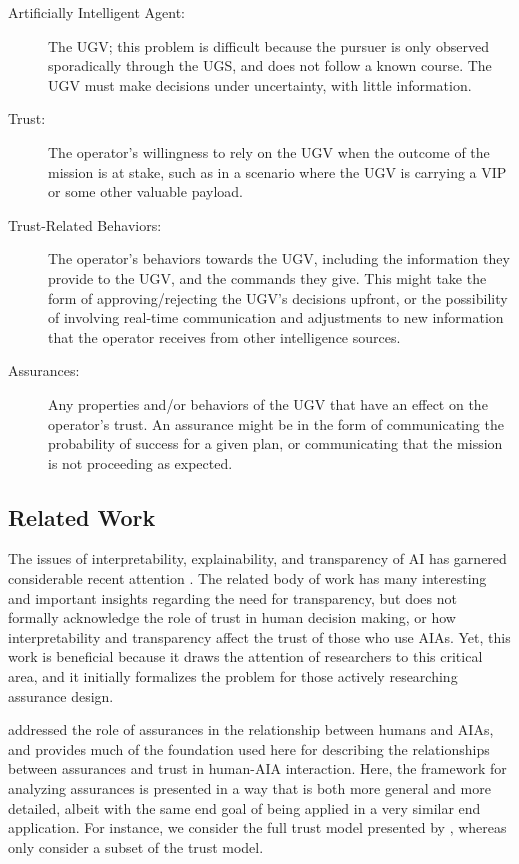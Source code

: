     \begin{description}
        \item [Artificially Intelligent Agent:] The UGV; this problem is difficult because the pursuer is only observed sporadically through the UGS, and does not follow a known course. The UGV must make decisions under uncertainty, with little information. 
        \item [Trust:] The operator's willingness to rely on the UGV when the outcome of the mission is at stake, such as in a scenario where the UGV is carrying a VIP or some other valuable payload.
        \item [Trust-Related Behaviors:] The operator's behaviors towards the UGV, including the information they provide to the UGV, and the commands they give. This might take the form of approving/rejecting the UGV's decisions upfront, or the possibility of involving real-time communication and adjustments to new information that the operator receives from other intelligence sources.
        \item [Assurances:] Any properties and/or behaviors of the UGV that have an effect on the operator's trust. An assurance might be in the form of communicating the probability of success for a given plan, or communicating that the mission is not proceeding as expected.
    \end{description}

\subsection{Related Work}\label{sec:rel_work}
    The issues of interpretability, explainability, and transparency of AI has garnered considerable recent attention \cite{Doshi-Velez2017-xy, Weller2017-zx, Lipton2016-ug, Gunning2017-ih}. The related body of work has many interesting and important insights regarding the need for transparency, but does not formally acknowledge the role of trust in human decision making, or how interpretability and transparency affect the trust of those who use AIAs. Yet, this work is beneficial because it draws the attention of researchers to this critical area, and it initially formalizes the problem for those actively researching assurance design.

    \citet{Lillard2016-yg} addressed the role of assurances in the relationship between humans and AIAs, and provides much of the foundation used here for describing the relationships between assurances and trust in human-AIA interaction. Here, the framework for analyzing assurances is presented in a way that is both more general and more detailed, albeit with the same end goal of being applied in a very similar end application. For instance, we consider the full trust model presented by \citet{McKnight2001-fa}, whereas \citeauthor{Lillard2016-yg} only consider a subset of the trust model.

